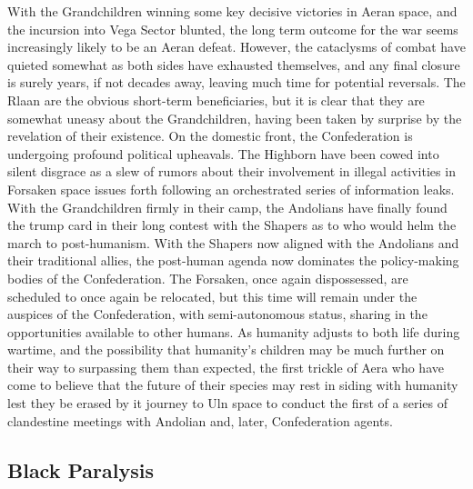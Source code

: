 With the Grandchildren winning some key decisive victories in Aeran
space, and the incursion into Vega Sector blunted, the long term
outcome for the war seems increasingly likely to be an Aeran
defeat. However, the cataclysms of combat have quieted somewhat as
both sides have exhausted themselves, and any final closure is surely
years, if not decades away, leaving much time for potential
reversals. The Rlaan are the obvious short-term beneficiaries, but it
is clear that they are somewhat uneasy about the Grandchildren, having
been taken by surprise by the revelation of their existence. On the
domestic front, the Confederation is undergoing profound political
upheavals. The Highborn have been cowed into silent disgrace as a slew
of rumors about their involvement in illegal activities in Forsaken
space issues forth following an orchestrated series of information
leaks. With the Grandchildren firmly in their camp, the Andolians have
finally found the trump card in their long contest with the Shapers as
to who would helm the march to post-humanism. With the Shapers now
aligned with the Andolians and their traditional allies, the
post-human agenda now dominates the policy-making bodies of the
Confederation. The Forsaken, once again dispossessed, are scheduled to
once again be relocated, but this time will remain under the auspices
of the Confederation, with semi-autonomous status, sharing in the
opportunities available to other humans. As humanity adjusts to both
life during wartime, and the possibility that humanity's children may
be much further on their way to surpassing them than expected, the
first trickle of Aera who have come to believe that the future of
their species may rest in siding with humanity lest they be erased by
it journey to Uln space to conduct the first of a series of
clandestine meetings with Andolian and, later, Confederation agents.

\subsection{Black Paralysis}


